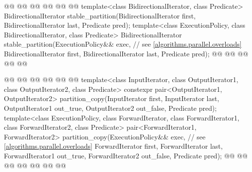 \begin{codeblock}
{    @@
        @@
      @@
      @@
        @@
  @\added{\}}@
  template<class BidirectionalIterator, class Predicate>
    BidirectionalIterator stable_partition(BidirectionalIterator first,
                                           BidirectionalIterator last,
                                           Predicate pred);
  template<class ExecutionPolicy, class BidirectionalIterator, class Predicate>
    BidirectionalIterator stable_partition(ExecutionPolicy&& exec, // see \ref{algorithms.parallel.overloads}
                                           BidirectionalIterator first,
                                           BidirectionalIterator last,
                                           Predicate pred);
  @@
    @@
        @@
      @@
      @@

    @@
        @@
      @@
      @@
        @@
  @\added{\}}@
  template<class InputIterator, class OutputIterator1,
           class OutputIterator2, class Predicate>
    constexpr pair<OutputIterator1, OutputIterator2>
      partition_copy(InputIterator first, InputIterator last,
                     OutputIterator1 out_true, OutputIterator2 out_false,
                     Predicate pred);
  template<class ExecutionPolicy, class ForwardIterator, class ForwardIterator1,
           class ForwardIterator2, class Predicate>
    pair<ForwardIterator1, ForwardIterator2>
      partition_copy(ExecutionPolicy&& exec, // see \ref{algorithms.parallel.overloads}
                     ForwardIterator first, ForwardIterator last,
                     ForwardIterator1 out_true, ForwardIterator2 out_false,
                     Predicate pred);
  @@
    @@
        @@
      @@
      @@
        @@
                      @@

}
\end{codeblock}
